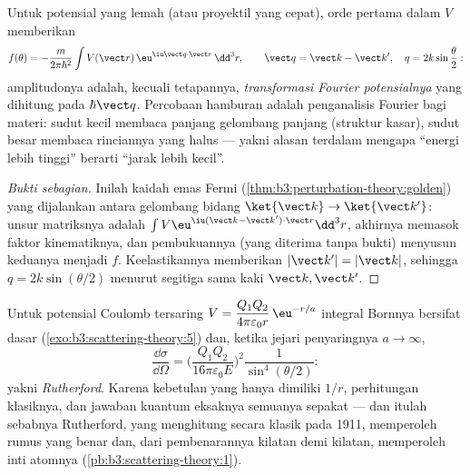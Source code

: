 \begin{theorem}\label{thm:b3:scattering-theory:born}
Untuk potensial yang lemah (atau proyektil yang cepat), 
orde pertama dalam $V$ memberikan
\[
f(\theta) = -\frac{m}{2\pi\hbar^2}
\int V(\vect r)\,\eu^{\iu\vect q\cdot\vect r}\,\dd^3r ,
\qquad
\vect q = \vect k - \vect k' , \quad
q = 2k\sin\frac\theta2 :
\]
amplitudonya adalah, kecuali tetapannya, \emph{transformasi Fourier
potensialnya} yang dihitung pada  $\hbar\vect q$.
Percobaan hamburan adalah penganalisis Fourier bagi materi: sudut kecil
membaca panjang gelombang panjang (struktur kasar), sudut besar membaca
rinciannya yang halus --- yakni alasan terdalam mengapa ``energi lebih
tinggi'' berarti ``jarak lebih kecil''.
\end{theorem}

\begin{proof}[Bukti sebagian]
Inilah kaidah emas Fermi
(\cref{thm:b3:perturbation-theory:golden}) yang dijalankan antara
gelombang bidang $\ket{\vect k} \to \ket{\vect k'}$: unsur matriksnya
adalah $\int V\eu^{\iu(\vect k - \vect k')\cdot\vect r}\dd^3r$,
 akhirnya memasok faktor kinematiknya, dan
pembukuannya (yang diterima tanpa bukti) menyusun keduanya menjadi $f$.
Keelastikannya memberikan $|\vect k'| = |\vect k|$, sehingga
$q = 2k\sin(\theta/2)$ menurut segitiga sama kaki $\vect k, \vect k'$.
\end{proof}

\begin{example}\label{ex:b3:scattering-theory:rutherford}
Untuk potensial Coulomb tersaring $V = \dfrac{Q_1Q_2}{4\pi
\varepsilon_0 r}\,\eu^{-r/a}$ integral Bornnya bersifat dasar
(\cref{exo:b3:scattering-theory:5}) dan, ketika jejari penyaringnya
$a \to \infty$,
\[
\frac{\dd\sigma}{\dd\Omega} =
\Big(\frac{Q_1Q_2}{16\pi\varepsilon_0 E}\Big)^2
\frac{1}{\sin^4(\theta/2)} :
\]
yakni \emph{ Rutherford}. Karena kebetulan yang hanya
dimiliki $1/r$, perhitungan klasiknya,  dan jawaban
kuantum eksaknya semuanya sepakat --- dan itulah sebabnya Rutherford,
yang menghitung secara klasik pada 1911, memperoleh rumus yang benar
dan, dari pembenarannya kilatan demi kilatan, memperoleh inti atomnya
(\cref{pb:b3:scattering-theory:1}).
\end{example}

